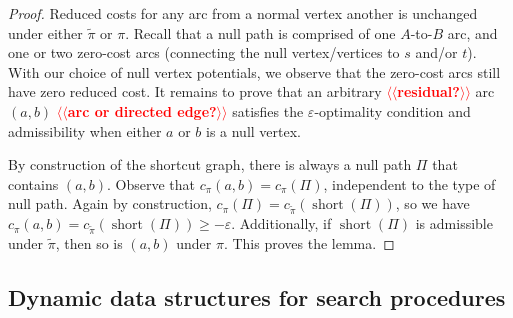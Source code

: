\documentclass[a4paper,UKenglish]{socg-lipics-v2018}
\makeatletter
\def\note#1{\textcolor{red}{{#1}}}
\def\eps{\varepsilon}
\def\short{\operatorname{short}}
\theoremstyle{plain}
\numberwithin{figure}{section}
\def\n@te#1{\textsf{\boldmath \textbf{$\langle\!\langle$#1$\rangle\!\rangle$}}\leavevmode}
\def\note#1{\textcolor{red}{\n@te{#1}}}
\makeatother
\begin{document}
\begin{proof}
Reduced costs for any arc from a normal vertex another is unchanged under either
$\tilde{\pi}$ or $\pi$.
Recall that a null path is comprised of one $A$-to-$B$ arc, and one or two
zero-cost arcs (connecting the null vertex/vertices to $s$ and/or $t$).
With our choice of null vertex potentials, we observe that the zero-cost arcs
still have zero reduced cost.
It remains to prove that an arbitrary \note{residual?} arc $(a, b)$ \note{arc or directed edge?} satisfies the $\eps$-optimality condition and admissibility when either $a$ or $b$ is a null vertex.

By construction of the shortcut graph,
there is always a null path $\Pi$ that contains $(a, b)$.
Observe that $c_\pi(a, b) = c_\pi(\Pi)$, independent to the type of null path.
Again by construction, $c_\pi(\Pi) = c_{\tilde{\pi}}(\short(\Pi))$, so we have
$c_\pi(a, b) = c_{\tilde{\pi}}(\short(\Pi)) \geq -\eps$.
Additionally, if $\short(\Pi)$ is admissible under $\tilde{\pi}$, then so is
$(a, b)$ under $\pi$.
%
This proves the lemma.
\end{proof}


\subsection{Dynamic data structures for search procedures}
\label{SS:ds-search}
\end{document}
